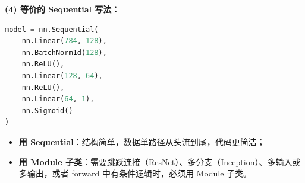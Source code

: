 \documentclass[a4paper,11pt]{ctexart}
\begin{document}
\begin{solutionbox}[参考答案与详细解析]
    \textbf{(4) 等价的 Sequential 写法：}

    \begin{lstlisting}[language=Python]
model = nn.Sequential(
    nn.Linear(784, 128),
    nn.BatchNorm1d(128),
    nn.ReLU(),
    nn.Linear(128, 64),
    nn.ReLU(),
    nn.Linear(64, 1),
    nn.Sigmoid()
)
    \end{lstlisting}

    \begin{keybox}
        \begin{itemize}
            \item \textbf{用 Sequential}：结构简单，数据单路径从头流到尾，代码更简洁；
            \item \textbf{用 Module 子类}：需要跳跃连接（ResNet）、多分支（Inception）、多输入或多输出，或者 forward 中有条件逻辑时，必须用 Module 子类。
        \end{itemize}
    \end{keybox}
\end{solutionbox}
\end{document}
